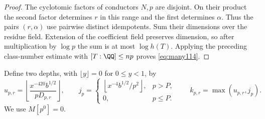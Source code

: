 \documentclass[a4paper,11pt]{article}
\theoremstyle{definition}
\theoremstyle{remark}
\numberwithin{equation}{section}
\begin{document}
\begin{proof}
The cyclotomic factors of conductors \(N,p\) are disjoint.
On their product the second factor determines \(r\) in this
range and the first determines \(\alpha\). Thus the pairs
\((r,\alpha)\) use pairwise distinct idempotents. Sum their
dimensions over the residue field. Extension of the coefficient
field preserves dimension, so after multiplication by \(\log p\)
the sum is at most \(\log h(T)\). Applying the preceding
class-number estimate with \([T:\QQ]\le np\) proves
\eqref{eq:many114}.
\end{proof}

Define two depths, with \(\lfloor y\rfloor=0\) for \(0\le y<1\),
by
\[
 u_{p,r}=\left\lfloor\frac{x^{-420}b^{1/2}}{pD_{p,r}}\right\rfloor,
 \qquad
 j_p=\begin{cases}
   \left\lfloor x^{-4}b^{1/2}/p^2\right\rfloor,&p>P,\\
   0,&p\le P.
 \end{cases}
 \qquad k_{p,r}=\max(u_{p,r},j_p).
\]
We use \(M[p^0]=0\).
\end{document}
